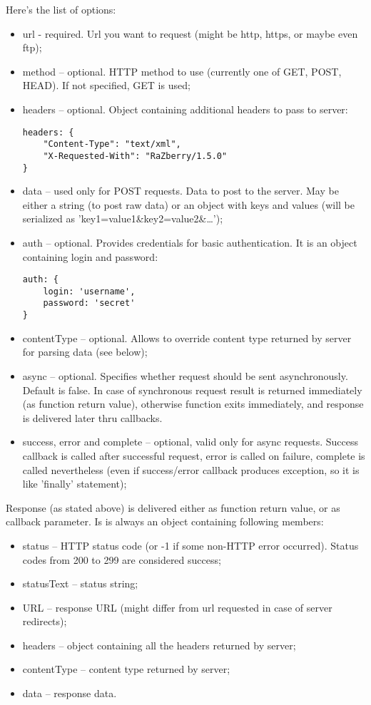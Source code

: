 Here's the list of options:
\begin{itemize}
\item url - required. Url you want to request (might be http, https, or maybe even ftp);
\item method – optional. HTTP method to use (currently one of GET, POST, HEAD). If not 
specified, GET is used;
\item headers – optional. Object containing additional headers to pass to server:

\begin{lstlisting}[basicstyle=\small,columns=fullflexible]
headers: {
    "Content-Type": "text/xml",
    "X-Requested-With": "RaZberry/1.5.0"
}
\end{lstlisting}

\item data – used only for POST requests. Data to post to the server. May be either a
string (to post raw data) or an object with keys and values (will be serialized as 
'key1=value1\&key2=value2\&…');
\item auth – optional. Provides credentials for basic authentication. It is an object 
containing login and password:

\begin{lstlisting}[basicstyle=\small,columns=fullflexible]
auth: {
    login: 'username',
    password: 'secret'
}
\end{lstlisting}

\item contentType – optional. Allows to override content type returned by server for 
parsing data (see below);
\item async – optional. Specifies whether request should be sent asynchronously. Default 
is false. In case of synchronous request result is returned immediately (as function 
return value), otherwise function exits immediately, and response is delivered later 
thru callbacks.
\item success, error and complete – optional, valid only for async requests. Success 
callback is called after successful request, error is called on failure, complete is 
called nevertheless (even if success/error callback produces exception, so it is like 
'finally' statement);
\end{itemize}

Response (as stated above) is delivered either as function return value, or as callback 
parameter. Is is always an object containing following members:

\begin{itemize}
\item status – HTTP status code (or -1 if some non-HTTP error occurred). Status codes 
from 200 to 299 are considered success;
\item statusText – status string;
\item URL – response URL (might differ from url requested in case of server redirects);
\item headers – object containing all the headers returned by server;
\item contentType – content type returned by server;
\item data – response data.
\end{itemize}

